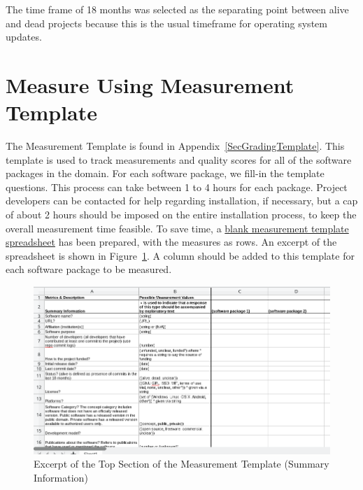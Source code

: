 \documentclass[letterpaper,cleveref]{lipics-v2019}
\begin{document}
\noindent The time frame of 18 months was selected as the separating point
between alive and dead projects because this is the usual timeframe for
operating system updates.

\section{Measure Using Measurement Template} \label{SecMeasureTemplate}

The Measurement Template is found in Appendix~\ref{SecGradingTemplate}.  This
template is used to track measurements and quality scores for all of the
software packages in the domain. For each software package, we fill-in the
template questions. This process can take between 1 to 4 hours for each package.
Project developers can be contacted for help regarding installation, if
necessary, but a cap of about 2 hours should be imposed on the entire
installation process, to keep the overall measurement time feasible.  To save
time, a
\href{https://github.com/smiths/AIMSS/blob/master/StateOfPractice/Methodology/Combined_MeasurementTemplate_EmpiricalMeasures.xlsx}{blank
measurement template spreadsheet} has been prepared, with the measures as rows.
An excerpt of the spreadsheet is shown in
Figure~\ref{measurement_template_image}.  A column should be added to this
template for each software package to be measured.

\begin{figure}[h!]
	\begin{center}
	  \includegraphics[width=1.0\textwidth]{measurement_template}
	  \caption{Excerpt of the Top Section of the Measurement Template (Summary Information)}
	  \label{measurement_template_image}
	\end{center}
  \end{figure}
  
\end{document}
